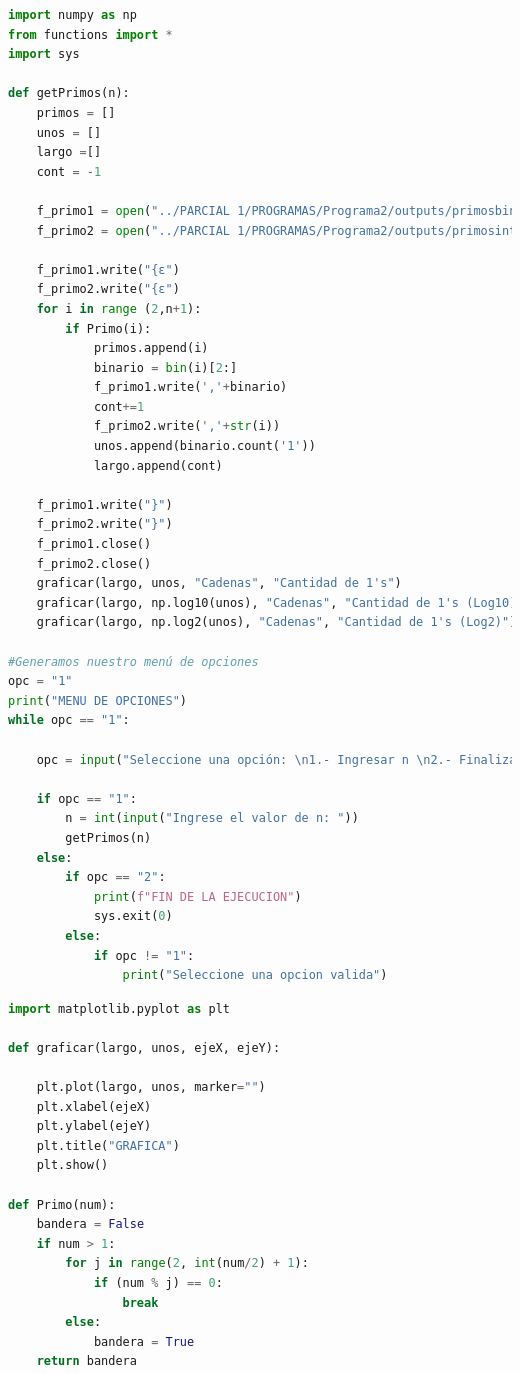 \documentclass{article}
\begin{document}
\begin{lstlisting}[language=Python, caption=Números primos hasta N]
import numpy as np
from functions import *
import sys

def getPrimos(n):
    primos = []
    unos = []
    largo =[]
    cont = -1

    f_primo1 = open("../PARCIAL 1/PROGRAMAS/Programa2/outputs/primosbin.txt", "w", encoding="utf-8")
    f_primo2 = open("../PARCIAL 1/PROGRAMAS/Programa2/outputs/primosint.txt", "w", encoding="utf-8")

    f_primo1.write("{ε")
    f_primo2.write("{ε")
    for i in range (2,n+1):
        if Primo(i):
            primos.append(i)
            binario = bin(i)[2:]
            f_primo1.write(','+binario)
            cont+=1
            f_primo2.write(','+str(i))    
            unos.append(binario.count('1'))
            largo.append(cont) 
    
    f_primo1.write("}")
    f_primo2.write("}")
    f_primo1.close()
    f_primo2.close()
    graficar(largo, unos, "Cadenas", "Cantidad de 1's")
    graficar(largo, np.log10(unos), "Cadenas", "Cantidad de 1's (Log10)")
    graficar(largo, np.log2(unos), "Cadenas", "Cantidad de 1's (Log2)")

#Generamos nuestro menú de opciones
opc = "1"
print("MENU DE OPCIONES")
while opc == "1":
    
    opc = input("Seleccione una opción: \n1.- Ingresar n \n2.- Finalizar\n")
    
    if opc == "1":
        n = int(input("Ingrese el valor de n: "))
        getPrimos(n)
    else:
        if opc == "2":
            print(f"FIN DE LA EJECUCION")
            sys.exit(0)
        else:
            if opc != "1":
                print("Seleccione una opcion valida")

\end{lstlisting}

\begin{lstlisting}[language=Python, caption=Funciones para la clase main]
import matplotlib.pyplot as plt

def graficar(largo, unos, ejeX, ejeY):
    
    plt.plot(largo, unos, marker="")
    plt.xlabel(ejeX)
    plt.ylabel(ejeY)
    plt.title("GRAFICA")
    plt.show()

def Primo(num):
    bandera = False
    if num > 1:  
        for j in range(2, int(num/2) + 1):  
            if (num % j) == 0:
                break  
        else:  
            bandera = True     
    return bandera
\end{lstlisting}
\end{document}
